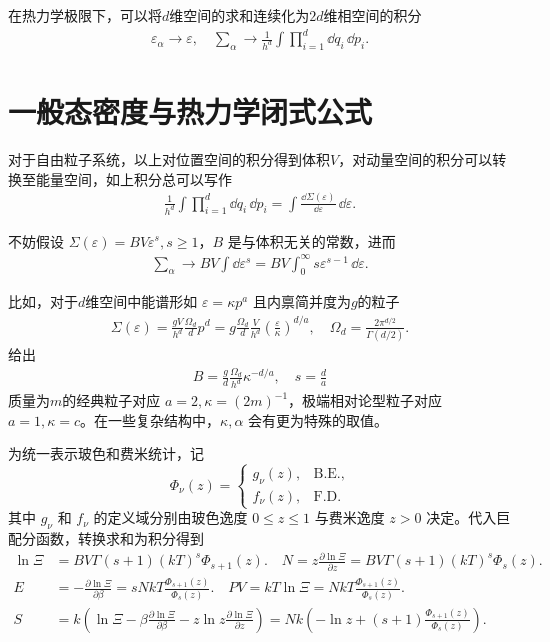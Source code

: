 在热力学极限下，可以将\(d\)维空间的求和连续化为\(2d\)维相空间的积分
\begin{align*}
	\varepsilon_{\alpha} \to \varepsilon, \quad \sum_{\alpha} \to \frac{1}{h^{d}} \int \prod_{i=1}^{d} \dd q_{i} \, \dd p_{i}.
\end{align*}

\section{一般态密度与热力学闭式公式}

对于自由粒子系统，以上对位置空间的积分得到体积\(V\)，对动量空间的积分可以转换至能量空间，如上积分总可以写作
\begin{align*}
	\frac{1}{h^{d}} \int \prod_{i=1}^{d} \dd q_{i} \, \dd p_{i} = \int \frac{\dd \Sigma(\varepsilon)}{\dd \varepsilon} \, \dd \varepsilon.
\end{align*}

不妨假设 \(\Sigma(\varepsilon) = B V \varepsilon^{s}, s \ge 1\)，\(B\) 是与体积无关的常数，进而
\begin{align*}
	\sum_{\alpha} \to B V \int \dd \varepsilon^{s} = B V \int_{0}^{\infty} s \varepsilon^{s-1} \, \dd \varepsilon.
\end{align*}

\begin{note}
	比如，对于\(d\)维空间中能谱形如 \(\varepsilon = \kappa p^{a}\) 且内禀简并度为\(g\)的粒子
	\begin{align*}
		\Sigma(\varepsilon) = \frac{g V}{h^{d}} \frac{\Omega_{d}}{d} p^{d} = g \frac{\Omega_{d}}{d} \frac{V}{h^{d}} \left( \frac{\varepsilon}{\kappa} \right)^{d/a}, \quad \Omega_{d} = \frac{2\pi^{d/2}}{\Gamma(d/2)}.
	\end{align*}
	给出
	\begin{align*}
		B=\frac{g}{d}\frac{\Omega_d}{h^d}\kappa^{-d/a},\quad s=\frac{d}{a}
	\end{align*}
	质量为\(m\)的经典粒子对应 \(a = 2, \kappa = (2m)^{-1}\)，极端相对论型粒子对应 \(a = 1, \kappa = c\)。在一些复杂结构中，\(\kappa, \alpha\) 会有更为特殊的取值。
\end{note}

为统一表示玻色和费米统计，记
\[
\Phi_{\nu}(z)=
\begin{cases}
g_{\nu}(z), & \text{B.E.},\\
f_{\nu}(z), & \text{F.D.}
\end{cases}
\]
其中 \(g_{\nu}\) 和 \(f_{\nu}\) 的定义域分别由玻色逸度 \(0\le z\le1\) 与费米逸度 \(z>0\) 决定。代入巨配分函数，转换求和为积分得到
\begin{align*}
	\ln \Xi &= B V \Gamma(s+1) (kT)^{s} \Phi_{s+1}(z). \quad
	N = z \frac{\partial \ln \Xi}{\partial z} = B V \Gamma(s+1) (kT)^{s} \Phi_{s}(z). \\
	E &= -\frac{\partial \ln \Xi}{\partial \beta} = s N k T \frac{\Phi_{s+1}(z)}{\Phi_{s}(z)}. \quad
	P V = k T \ln \Xi = N k T \frac{\Phi_{s+1}(z)}{\Phi_{s}(z)}. \\
	S &= k \left( \ln \Xi - \beta \frac{\partial \ln \Xi}{\partial \beta} - z \ln z \frac{\partial \ln \Xi}{\partial z} \right) = N k \left( -\ln z + (s+1) \frac{\Phi_{s+1}(z)}{\Phi_{s}(z)} \right).
\end{align*}

